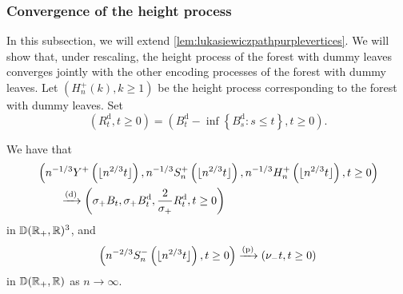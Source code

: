 \subsubsection{Convergence of the height process}\label{subsubsec.convheightprocess}
In this subsection, we will extend \cref{lem:lukasiewiczpathpurplevertices}. We will show that, under rescaling, the height process of the forest with dummy leaves converges jointly with the other encoding processes of the forest with dummy leaves. 
Let $(H^+_n(k),k\geq 1)$ be the height process corresponding to the forest with dummy leaves. Set $$(R^{\mathrm{d}}_t,t\geq 0)=\left({B}^{\mathrm{d}}_t-\inf\left\{{B}^{\mathrm{d}}_s: s\leq t\right\},t\geq 0 \right).$$
\begin{proposition}
\label{prop:convheightprocesspurple}
We have that 
\begin{align*}&\left(n^{-1/3}Y^{+}\left(\lfloor n^{2/3}t\rfloor\right), n^{-1/3}S^{+}_n\left(\lfloor n^{2/3}t\rfloor\right),n^{-1/3}H^{+}_n\left(\lfloor n^{2/3}t\rfloor\right), t\geq 0\right) \\
&\qquad \xrightarrow[]{\mathrm{(d)}}\left(\sigma_+B_t,\sigma_+{B}^{\mathrm{d}}_t, \frac{2}{\sigma_+} R^{\mathrm{d}}_t,  t\geq 0\right)\end{align*}
 in ${\mathbb D}({\mathbb R}_+,{\mathbb R})^3$, and 
 $$\left(n^{-2/3}S^{-}_n\left(\lfloor n^{2/3}t\rfloor\right),t\geq 0\right)\xrightarrow[]{\mathrm{(p)}}\left(\nu_- t,t\geq 0\right)$$
 in ${\mathbb D}({\mathbb R}_+,{\mathbb R})$ as $n\to\infty$.
\end{proposition}

